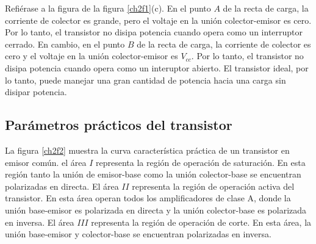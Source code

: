 \documentclass{article}
\begin{document}
Refiérase a la figura de la figura \ref{ch2f1}(c). En el punto $A$ de la recta de carga, la corriente de colector es grande, pero el voltaje en la unión colector-emisor es cero. Por lo tanto, el transistor no disipa potencia cuando opera como un interruptor cerrado. En cambio, en el punto $B$ de la recta de carga, la corriente de colector es cero y el voltaje en la unión colector-emisor es $V_{cc}$. Por lo tanto, el transistor no disipa potencia cuando opera como un interuptor abierto. El transistor ideal, por lo tanto, puede manejar una gran cantidad de potencia hacia una carga sin disipar potencia.


 \subsection{Parámetros prácticos del transistor}
 La figura \ref{ch2f2} muestra la curva característica práctica de un transistor en emisor común. el área $I$ representa la región de operación de saturación. En esta región tanto la unión de emisor-base como la unión colector-base se encuentran polarizadas en directa. El área $II$ representa la región de operación activa del transistor. En esta área operan todos los amplificadores de clase A, donde la unión base-emisor es polarizada en directa y la unión colector-base es polarizada en inversa. El área $III$ representa la región de operación de corte. En esta área, la unión base-emisor y colector-base se encuentran polarizadas en inversa. 
 
\end{document}
